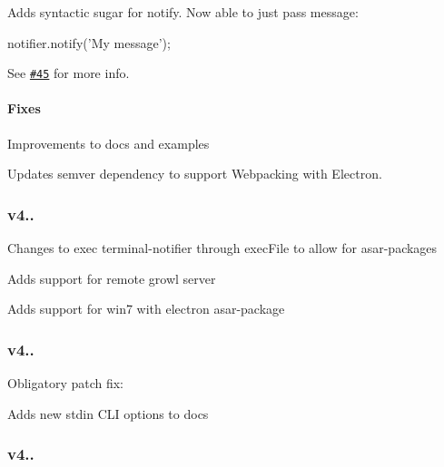\begin{DoxyEnumerate}
\item Adds syntactic sugar for {\ttfamily notify}. Now able to just pass message\+: 
\begin{DoxyCode}
notifier.notify('My message');
\end{DoxyCode}

\end{DoxyEnumerate}

See \href{https://github.com/mikaelbr/node-notifier/issues/45}{\tt \#45} for more info.

\paragraph*{Fixes}


\begin{DoxyEnumerate}
\item Improvements to docs and examples
\item Updates {\ttfamily semver} dependency to support Webpacking with Electron.
\end{DoxyEnumerate}

\subsubsection*{{\ttfamily v4..}}


\begin{DoxyEnumerate}
\item Changes to exec terminal-\/notifier through exec\+File to allow for asar-\/packages
\item Adds support for remote growl server
\item Adds support for win7 with electron asar-\/package
\end{DoxyEnumerate}

\subsubsection*{{\ttfamily v4..}}

Obligatory patch fix\+:
\begin{DoxyEnumerate}
\item Adds new stdin C\+LI options to docs
\end{DoxyEnumerate}

\subsubsection*{{\ttfamily v4..}}


